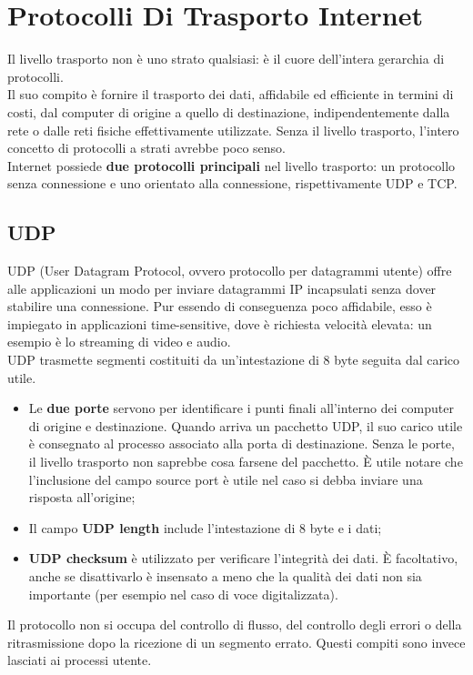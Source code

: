 \section{Protocolli Di Trasporto Internet}
    Il livello trasporto non è uno strato qualsiasi: è il cuore dell’intera gerarchia di protocolli.\\
    
    Il suo compito è fornire il trasporto dei dati, affidabile ed efficiente in termini di costi, dal
    computer di origine a quello di destinazione, indipendentemente dalla rete o dalle reti fisiche
    effettivamente utilizzate. Senza il livello trasporto, l’intero concetto di protocolli a strati
    avrebbe poco senso.\\
    
    Internet possiede \textbf{due protocolli principali} nel livello trasporto: un protocollo senza
    connessione e uno orientato alla connessione, rispettivamente UDP e TCP.
        \subsection{UDP}
        UDP (User Datagram Protocol, ovvero protocollo per datagrammi utente) offre alle
        applicazioni un modo per inviare datagrammi IP incapsulati senza dover stabilire una
        connessione. Pur essendo di conseguenza poco affidabile, esso è impiegato in applicazioni
        time-sensitive, dove è richiesta velocità elevata: un esempio è lo streaming di video e audio.\\
        
        UDP trasmette segmenti costituiti da un’intestazione di 8 byte seguita dal carico utile.
        \begin{itemize}
            \item Le \textbf{due porte} servono per identificare i punti finali all’interno dei computer di origine e
            destinazione. Quando arriva un pacchetto UDP, il suo carico utile è consegnato al
            processo associato alla porta di destinazione. Senza le porte, il livello trasporto non
            saprebbe cosa farsene del pacchetto. È utile notare che l’inclusione del campo source
            port è utile nel caso si debba inviare una risposta all’origine;
            \item Il campo \textbf{UDP length} include l’intestazione di 8 byte e i dati;
            \item \textbf{UDP checksum} è utilizzato per verificare l’integrità dei dati. È facoltativo, anche se
            disattivarlo è insensato a meno che la qualità dei dati non sia importante (per esempio
            nel caso di voce digitalizzata).
            
        \end{itemize}
        Il protocollo non si occupa del controllo di flusso, del controllo degli errori o della
        ritrasmissione dopo la ricezione di un segmento errato. Questi compiti sono invece lasciati ai
        processi utente.\\

